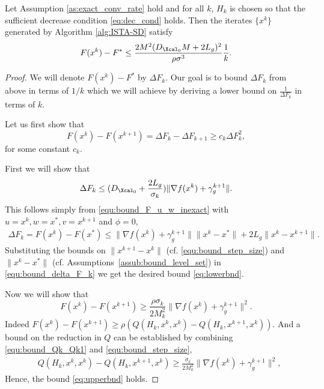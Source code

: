 \documentclass[11pt]{article}
\numberwithin{equation}{section}
\begin{document}
\begin{theorem}\label{the:ISTA-SD}
Let Assumption \ref{as:exact_conv_rate} hold and for all $k$, $H_k$ is chosen so that the sufficient decrease condition \eqref{eq:dec_cond} holds.
Then the iterates $\{x^k\}$ generated by Algorithm \ref{alg:ISTA-SD} satisfy
\begin{align}
    \label{the:ISTA-nonsmooth-conclude} 
    F(x^k)-F^* \leq  \frac{2M^2 (D_{\Xcal_0} M+2L_g)^2}{\rho\sigma^3}\frac{1}{k}.
\end{align}
\end{theorem}
\begin{proof}
	We will denote $F(x^k)-F^*$ by $\Delta F_k$.  Our goal is to bound $\Delta F_k$ from above  in terms of $1/k$ which we will achieve by deriving a lower bound  on $\frac{1}{\Delta F_k}$ in terms of $k$. 

	Let us first show that 
	\begin{equation}\label{eq:mainbnd}
	F(x^{k})-F(x^{k+1})=\Delta F_k-\Delta F_{k+1}\geq c_k \Delta F_k^2,
	\end{equation}
	for some constant $c_k$. 

	First we will show that 
	\begin{equation}\label{eq:lowerbnd}
	\Delta F_k\leq (D_{\Xcal_0}+\frac{2L_g}{\sigma_k}) \|\nabla f(x^k)+\gamma_g^{k+1}\|.
	\end{equation}
	This follows simply from \eqref{equ:bound_F_u_w_inexact} with $u = x^k, w = x^*, v = x^{k+1}$ and $\phi = 0$,
	\begin{align}
	\label{equ:bound_delta_F_k}
	    \Delta F_k = F(x^k) - F(x^*)
	    \leq \|\nabla f(x^k)+\gamma_{g}^{k+1}\|\|x^k-x^*\| + 2L_g \|x^k-x^{k+1}\|. 
	\end{align}
	Substituting the bounds on  $\| x^{k+1} - x^k\|$ (cf. \eqref{equ:bound_step_size}) and   $\| x^{k} - x^*\|$ (cf. Assumptions~\ref{assub:bound_level_set})
	in \eqref{equ:bound_delta_F_k} we get
	the desired bound \eqref{eq:lowerbnd}.  

	Now we will show that 
	\begin{equation}\label{eq:upperbnd}
		F(x^k) - F(x^{k+1})\geq \frac{\rho\sigma_k}{2M_k^2}\|\nabla f(x^k)+\gamma_g^{k+1}\|^2.
	\end{equation}
	Indeed $F(x^{k})-F(x^{k+1})\geq \rho (Q(H_k, x^{k}, x^k)-Q(H_k,x^{k+1}, x^k))$. And a bound on the reduction in $Q$ can be established by combining \eqref{equ:bound_Qk_Qk1} and \eqref{equ:bound_step_size},
    \begin{align*}
	    &Q(H_k,x^k,x^k) - Q(H_k,x^{k+1}, x^k) \geq \frac{\sigma_k}{2M_k^2}   \| \nabla f(x^k) + \gamma_g^{k+1}\| ^2,  
    \end{align*}
	Hence, the bound \eqref{eq:upperbnd} holds.




\end{proof}
\end{document}
